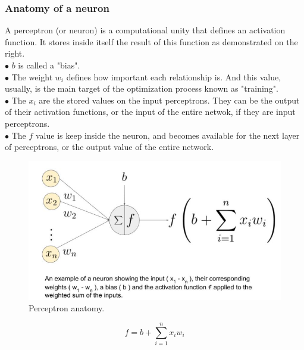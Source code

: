 \documentclass[xcolor=dvipsnames,10pt,aspectratio=169]{beamer}
\begin{document}
\begin{frame}
	\frametitle{Anatomy of a neuron}
	\begin{minipage}[h!]{0.45\textwidth}
		A perceptron (or neuron) is a computational unity that defines an activation function. It stores inside itself the result of this function as demonstrated on the right.\\
		$\bullet$ $b$ is called a "bias".\\
		$\bullet$ The weight $w_i$ defines how important each relationship is. And this value, usually, is the main target of the optimization process known as "training".\\
		$\bullet$ The $x_i$ are the stored values on the input perceptrons. They can be the output of their activation functions, or the input of the entire netwok, if they are input perceptrons.\\
		$\bullet$ The $f$ value is keep inside the neuron, and becomes available for the next layer of perceptrons, or the output value of the entire network.
	\end{minipage}
	\begin{minipage}[h!]{0.45\textwidth}
	\begin{figure}[h!]
		\centering
		\includegraphics[trim = {0cm 3cm 11cm 0cm}, clip , angle=0, scale=0.26]{./figuras/neuron_anatomy.png}
		\caption{Perceptron anatomy.}
	\end{figure}
	\begin{equation}
		f = b + \sum^n_{i=1} x_i w_i
	\end{equation}
	\end{minipage}
\end{frame}
\end{document}
